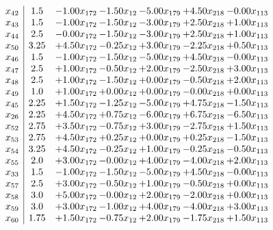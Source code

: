 \documentclass[8pt]{article}
\begin{document}
\[\begin{array}{c| c c@{\hskip 2pt} c@{\hskip 2pt} c@{\hskip 2pt} c@{\hskip 2pt} c@{\hskip 2pt} }
 x_{42}   &  1.5 & -1.00 x_{172} & -1.50 x_{12} & -5.00 x_{179} & +  4.50 x_{218} & -0.00 x_{113}\\
 x_{43}   &  1.5 & -1.00 x_{172} & -1.50 x_{12} & -3.00 x_{179} & +  2.50 x_{218} & +  1.00 x_{113}\\
 x_{44}   &  2.5 & -0.00 x_{172} & -1.50 x_{12} & -3.00 x_{179} & +  2.50 x_{218} & +  1.00 x_{113}\\
 x_{50}   &  3.25 & +  4.50 x_{172} & -0.25 x_{12} & +  3.00 x_{179} & -2.25 x_{218} & +  0.50 x_{113}\\
 x_{46}   &  1.5 & -1.00 x_{172} & -1.50 x_{12} & -5.00 x_{179} & +  4.50 x_{218} & -0.00 x_{113}\\
 x_{47}   &  2.5 & +  1.00 x_{172} & -0.50 x_{12} & +  2.00 x_{179} & -2.50 x_{218} & +  3.00 x_{113}\\
 x_{48}   &  2.5 & +  1.00 x_{172} & -1.50 x_{12} & +  0.00 x_{179} & -0.50 x_{218} & +  2.00 x_{113}\\
 x_{49}   &  1.0 & +  1.00 x_{172} & +  0.00 x_{12} & +  0.00 x_{179} & -0.00 x_{218} & +  0.00 x_{113}\\
 x_{45}   &  2.25 & +  1.50 x_{172} & -1.25 x_{12} & -5.00 x_{179} & +  4.75 x_{218} & -1.50 x_{113}\\
 x_{26}   &  2.25 & +  4.50 x_{172} & +  0.75 x_{12} & -6.00 x_{179} & +  6.75 x_{218} & -6.50 x_{113}\\
 x_{52}   &  2.75 & +  3.50 x_{172} & -0.75 x_{12} & +  3.00 x_{179} & -2.75 x_{218} & +  1.50 x_{113}\\
 x_{53}   &  2.75 & +  4.50 x_{172} & +  0.25 x_{12} & +  0.00 x_{179} & +  0.25 x_{218} & -1.50 x_{113}\\
 x_{54}   &  3.25 & +  4.50 x_{172} & -0.25 x_{12} & +  1.00 x_{179} & -0.25 x_{218} & -0.50 x_{113}\\
 x_{55}   &  2.0 & +  3.00 x_{172} & -0.00 x_{12} & +  4.00 x_{179} & -4.00 x_{218} & +  2.00 x_{113}\\
 x_{33}   &  1.5 & -1.00 x_{172} & -1.50 x_{12} & -5.00 x_{179} & +  4.50 x_{218} & -0.00 x_{113}\\
 x_{57}   &  2.5 & +  3.00 x_{172} & -0.50 x_{12} & +  1.00 x_{179} & -0.50 x_{218} & +  0.00 x_{113}\\
 x_{58}   &  3.0 & +  5.00 x_{172} & -0.00 x_{12} & +  2.00 x_{179} & -2.00 x_{218} & +  0.00 x_{113}\\
 x_{59}   &  3.0 & +  3.00 x_{172} & -1.00 x_{12} & +  4.00 x_{179} & -4.00 x_{218} & +  3.00 x_{113}\\
 x_{60}   &  1.75 & +  1.50 x_{172} & -0.75 x_{12} & +  2.00 x_{179} & -1.75 x_{218} & +  1.50 x_{113}\\

\end{array}\]
\end{document}
